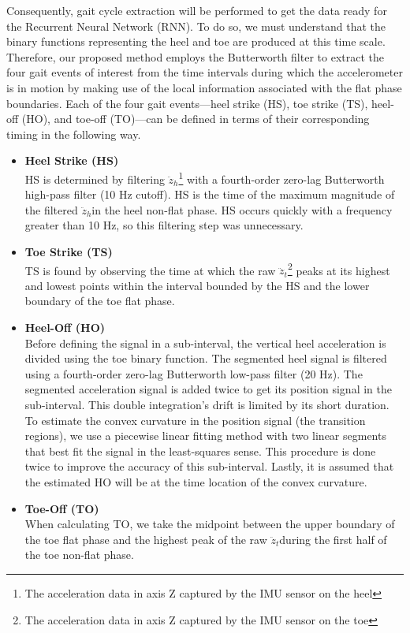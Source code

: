 \bigskip

Consequently, gait cycle extraction will be performed to get the data ready for the Recurrent Neural Network (RNN). To do so, we must understand that the binary functions representing the heel and toe are produced at this time scale. Therefore, our proposed method employs the Butterworth filter to extract the four gait events of interest from the time intervals during which the accelerometer is in motion by making use of the local information associated with the flat phase boundaries. Each of the four gait events—heel strike (HS), toe strike (TS), heel-off (HO), and toe-off (TO)—can be defined in terms of their corresponding timing in the following way.

\begin{itemize}

  \item \textbf{Heel Strike (HS)}\\
  HS is determined by filtering $\ddot{z}_h$\footnote{The acceleration data in axis Z captured by the IMU sensor on the heel} with a fourth-order zero-lag Butterworth high-pass filter (10 Hz cutoff). HS is the time of the maximum magnitude of the filtered $\ddot{z}_h$\footnotemark[\value{footnote}] in the heel non-flat phase. HS occurs quickly with a frequency greater than 10 Hz, so this filtering step was unnecessary.
  \\
  \item \textbf{Toe Strike (TS)}\\
  TS is found by observing the time at which the raw $\ddot{z}_t$\footnote{The acceleration data in axis Z captured by the IMU sensor on the toe} peaks at its highest and lowest points within the interval bounded by the HS and the lower boundary of the toe flat phase.
  \\
  \item \textbf{Heel-Off (HO)}\\
  Before defining the signal in a sub-interval, the vertical heel acceleration is divided using the toe binary function. The segmented heel signal is filtered using a fourth-order zero-lag Butterworth low-pass filter (20 Hz). The segmented acceleration signal is added twice to get its position signal in the sub-interval. This double integration's drift is limited by its short duration. To estimate the convex curvature in the position signal (the transition regions), we use a piecewise linear fitting method with two linear segments that best fit the signal in the least-squares sense. This procedure is done twice to improve the accuracy of this sub-interval. Lastly, it is assumed that the estimated HO will be at the time location of the convex curvature.
  \\
  \item \textbf{Toe-Off (TO)}\\
  When calculating TO, we take the midpoint between the upper boundary of the toe flat phase and the highest peak of the raw $\ddot{z}_t$\footnotemark[\value{footnote}] during the first half of the toe non-flat phase.
  \\  
\end{itemize}
